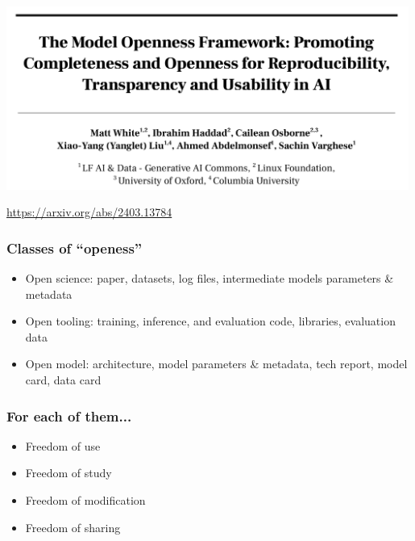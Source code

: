 \documentclass[17pt,aspectratio=169,hyperref={pdfusetitle,colorlinks,allcolors=olive}]{beamer}
\begin{document}
\begin{frame}[fragile]
\frametitle{}

  \includegraphics[height=6cm]{figs/paper-openess-framework}

  \begin{flushright}
    {\small
      \url{https://arxiv.org/abs/2403.13784}
    }
  \end{flushright} 

\end{frame}

\begin{frame}[fragile]
\frametitle{Classes of ``openess''}

\begin{itemize}
\item Open science: paper, datasets, log files, intermediate models parameters \& metadata
\item Open tooling: training, inference, and evaluation code, libraries, evaluation data
\item Open model: architecture, model parameters \& metadata, tech report, model card, data card
\end{itemize}

\end{frame}

\begin{frame}[fragile]
\frametitle{For each of them...}

\begin{itemize}
\item Freedom of use
\item Freedom of study
\item Freedom of modification
\item Freedom of sharing
\end{itemize}
\end{frame}
\end{document}
